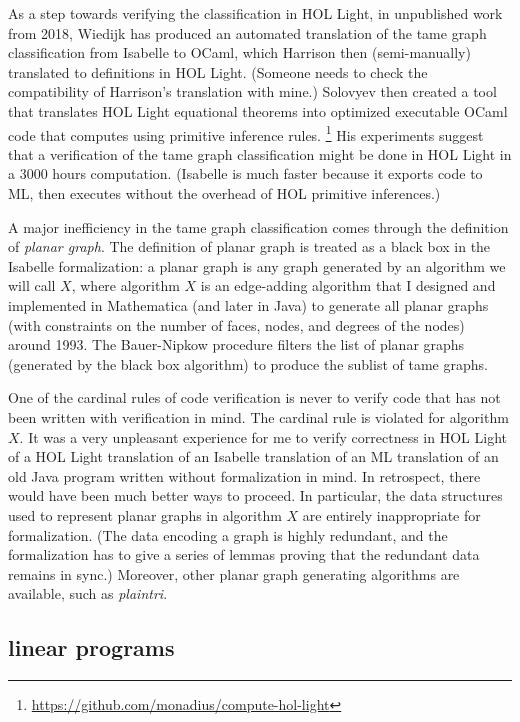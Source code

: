 \documentclass{amsart}
\begin{document}
As a step towards verifying the classification in HOL Light, in
unpublished work from 2018, Wiedijk has produced an automated
translation of the tame graph classification from Isabelle to OCaml,
which Harrison then (semi-manually) translated to definitions in HOL Light.
(Someone needs to check the compatibility of Harrison's translation with mine.)
Solovyev then created a tool that translates HOL Light equational theorems
into optimized executable OCaml code that computes using primitive inference rules.%
\footnote{\url{https://github.com/monadius/compute-hol-light}} His
experiments suggest that a verification of the tame graph
classification might be done in HOL Light in a 3000 hours computation.
(Isabelle is much faster because it exports code to ML, then executes
without the overhead of HOL primitive inferences.)

A major inefficiency in the tame graph classification comes through
the definition of \emph{planar graph}.  The definition of planar graph
is treated as a black box in the Isabelle formalization: a planar
graph is any graph generated by an algorithm we will call $X$, where
algorithm $X$ is an edge-adding algorithm that I designed and
implemented in Mathematica (and later in Java) to generate all planar
graphs (with constraints on the number of faces, nodes, and degrees of
the nodes) around 1993.  The Bauer-Nipkow procedure filters the list
of planar graphs (generated by the black box algorithm) to produce the
sublist of tame graphs.

One of the cardinal rules of code verification is never
to verify code that has not been written with verification in mind.
The cardinal rule is violated for algorithm $X$.  It was a very
unpleasant experience for me to verify correctness in HOL Light of a
HOL Light translation of an Isabelle translation of an ML translation
of an old Java program written without formalization in mind.  In
retrospect, there would have been much better ways to proceed.  In
particular, the data structures used to represent planar graphs in
algorithm $X$ are entirely inappropriate for formalization.  (The data
encoding a graph is highly redundant, and the formalization has to
give a series of lemmas proving that the redundant data remains
in sync.)  Moreover, other planar graph generating algorithms
are available, such as \emph{plaintri}.

\subsection{linear programs}
\end{document}
